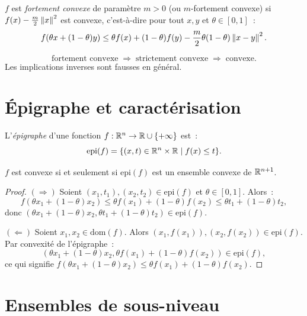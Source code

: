 \begin{definition}
$f$ est \emph{fortement convexe} de param\`etre $m > 0$ (ou $m$-fortement convexe) si
$f(x) - \frac{m}{2}\left\| x \right\|^2$ est convexe, c'est-\`a-dire pour tout $x, y$ et
$\theta \in [0,1]$~:
\[
    f(\theta x + (1-\theta)y) \leq \theta f(x) + (1-\theta)f(y)
    - \frac{m}{2}\theta(1-\theta)\left\| x-y \right\|^2.
\]
\end{definition}

\begin{formules}[title=\textbf{Hi\'erarchie de convexit\'e}]
\[
    \text{fortement convexe} \;\Rightarrow\; \text{strictement convexe}
    \;\Rightarrow\; \text{convexe}.
\]
Les implications inverses sont fausses en g\'en\'eral.
\end{formules}

\section{\'Epigraphe et caract\'erisation}

\begin{definition}[\'Epigraphe]
L'\emph{\'epigraphe} d'une fonction $f : \mathbb{R}^n \to \mathbb{R} \cup \{+\infty\}$ est~:
\[
    \mathrm{epi}(f) = \{(x, t) \in \mathbb{R}^n \times \mathbb{R} \mid f(x) \leq t\}.
\]
\end{definition}

\begin{theoreme}
\label{thm:epigraphe}
$f$ est convexe si et seulement si $\mathrm{epi}(f)$ est un ensemble convexe de
$\mathbb{R}^{n+1}$.
\end{theoreme}

\begin{proof}
$(\Rightarrow)$ Soient $(x_1, t_1), (x_2, t_2) \in \mathrm{epi}(f)$ et
$\theta \in [0,1]$. Alors~:
\[
    f(\theta x_1 + (1-\theta)x_2) \leq \theta f(x_1) + (1-\theta)f(x_2)
    \leq \theta t_1 + (1-\theta)t_2,
\]
donc $(\theta x_1 + (1-\theta)x_2, \theta t_1 + (1-\theta)t_2) \in \mathrm{epi}(f)$.

$(\Leftarrow)$ Soient $x_1, x_2 \in \mathrm{dom}(f)$. Alors
$(x_1, f(x_1)), (x_2, f(x_2)) \in \mathrm{epi}(f)$. Par convexit\'e de l'\'epigraphe~:
\[
    (\theta x_1 + (1-\theta)x_2, \theta f(x_1) + (1-\theta)f(x_2)) \in \mathrm{epi}(f),
\]
ce qui signifie $f(\theta x_1 + (1-\theta)x_2) \leq \theta f(x_1) + (1-\theta)f(x_2)$.
\end{proof}

\section{Ensembles de sous-niveau}


